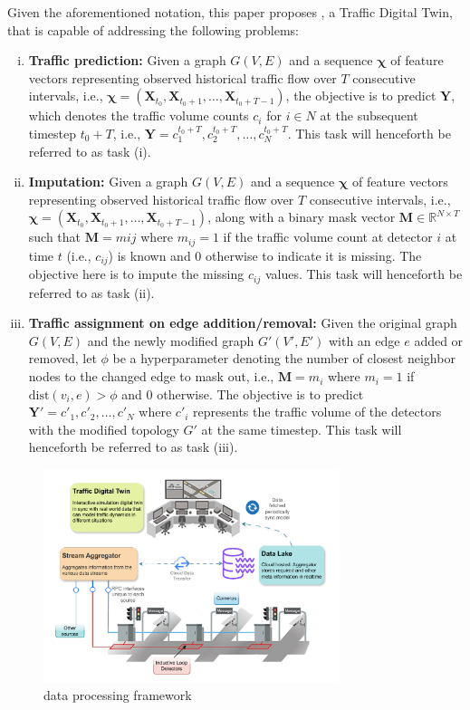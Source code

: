 Given the aforementioned notation, this paper proposes \name, a Traffic Digital Twin, that is capable of addressing the following problems:
\begin{enumerate}[(i)]
    \item \textbf{Traffic prediction:} Given a graph $G(V, E)$ and a sequence $\bm{\chi}$ of feature vectors representing observed historical traffic flow over $T$ consecutive intervals, i.e., $\bm{\chi} = (\mathbf{X}_{t_0}, \mathbf{X}_{t_0+1}, \ldots, \mathbf{X}_{t_0+T-1})$, the objective is to predict $\mathbf{Y}$, which denotes the traffic volume counts $c_i$ for $i \in N$ at the subsequent timestep $t_0+T$, i.e., $\mathbf{Y} = {c_1^{t_0+T}, c_2^{t_0+T}, \ldots, c_N^{t_0+T}}$. This task will henceforth be referred to as task (i).
    \item \textbf{Imputation:} Given a graph $G(V, E)$ and a sequence $\bm{\chi}$ of feature vectors representing observed historical traffic flow over $T$ consecutive intervals, i.e., $\bm{\chi} = (\mathbf{X}_{t_0}, \mathbf{X}_{t_0+1}, \ldots, \mathbf{X}_{t_0+T-1})$, along with a binary mask vector $\mathbf{M} \in \mathbb{R}^{N \times T}$ such that $\mathbf{M} = {m{ij}}$ where $m_{ij} = 1$ if the traffic volume count at detector $i$ at time $t$ (i.e., $c_{ij}$) is known and $0$ otherwise to indicate it is missing. The objective here is to impute the missing $c_{ij}$ values. This task will henceforth be referred to as task (ii).
    \item \textbf{Traffic assignment on edge addition/removal:} Given the original graph $G(V, E)$ and the newly modified graph $G'(V', E')$ with an edge $e$ added or removed, let $\phi$ be a hyperparameter denoting the number of closest neighbor nodes to the changed edge to mask out, i.e., $\mathbf{M} = {m_i}$ where $m_i = 1$ if $\text{dist}(v_i, e) > \phi$ and 0 otherwise. The objective is to predict $\mathbf{Y'} = {c'_1, c'_2, \ldots, c'_N}$ where $c'_i$ represents the traffic volume of the detectors with the modified topology $G'$ at the same timestep. This task will henceforth be referred to as task (iii).
\end{enumerate}
\begin{figure}[t]
  \centering
  \includegraphics[width=0.77\textwidth]{framework.pdf} %
  \caption{\name data processing framework}
  \label{fig:framework}
\end{figure}